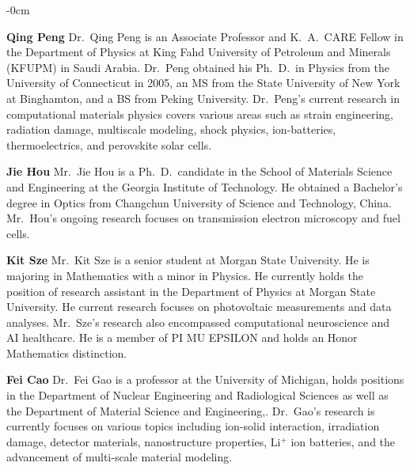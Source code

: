 \documentclass[molecules,review,submit,pdftex,moreauthors]{Definitions/mdpi}
\begin{document}
\begin{adjustwidth}{-\extralength}{0cm}
\bio

{}
{\textbf{Qing Peng} Dr.~Qing Peng is an Associate Professor and K.~A.~CARE Fellow in the Department of Physics at King Fahd University of Petroleum and Minerals (KFUPM) in Saudi Arabia. Dr.~Peng obtained his Ph.~D.~in Physics from the University of Connecticut in 2005, an MS from the State University of New York at Binghamton, and a BS from Peking University. Dr.~Peng's current research in computational materials physics covers various areas such as strain engineering, radiation damage, multiscale modeling, shock physics, ion-batteries, thermoelectrics, and perovskite solar cells.}


\bio

{}
{\textbf{Jie Hou} Mr.~Jie Hou is a Ph.~D.~candidate in the School of Materials Science and Engineering at the Georgia Institute of Technology.  He obtained a Bachelor's degree in Optics from Changchun University of Science and Technology, China.  Mr.~Hou's ongoing research focuses on transmission electron microscopy and fuel cells.}


\bio

{}
{\textbf{Kit Sze} Mr.~Kit Sze is a senior student at Morgan State University.  He is majoring in Mathematics with a minor in Physics.  He currently holds the position of research assistant in the Department of Physics at Morgan State University.  He  current research focuses on photovoltaic measurements and data analyses.  Mr.~Sze's research also encompassed  computational neuroscience and AI healthcare.  He is a member of PI MU EPSILON and holds an Honor Mathematics distinction.}


\bio

{}
{\textbf{Fei Cao} Dr.~Fei Gao is a professor at the University of Michigan, holds positions in the Department of Nuclear Engineering and Radiological Sciences as well as the Department of Material Science and Engineering,. Dr.~Gao's research is currently focuses on various topics including ion-solid interaction, irradiation damage, detector materials, nanostructure properties, Li$^+$ ion batteries, and the  advancement of multi-scale material modeling.
}



\end{adjustwidth}
\end{document}
